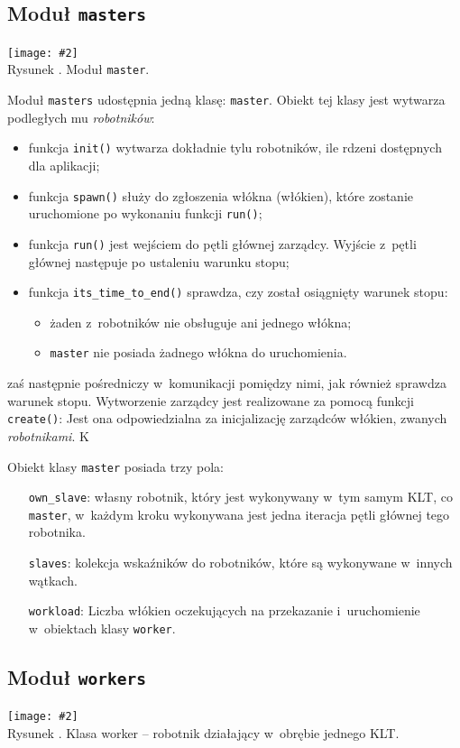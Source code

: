 \documentclass[12pt,makeidx]{mwart}
\newcommand{\code}{\texttt}
\newcounter{figmain}
\newcommand{\myownfigure}[4]{ \newcounter{#1} \setcounter{#1}{\value{figmain}} \addtocounter{figmain}{1} \begin{center} \label{fig:#1} \centering \texttt{[image: \#2]}\\ \nopagebreak[4] Rysunek \arabic{#1}. #3. \end{center}}
\begin{document}
\subsection{Moduł \code{masters}}
    \myownfigure{Master}{Master.png}{Moduł \code{master}}{.7}
%
\indent
  Moduł \code{masters} udostępnia jedną klasę: \code{master}.
  Obiekt tej klasy jest wytwarza podległych mu \emph{robotników}:  
  \begin{itemize}
    \item funkcja \code{init()} wytwarza dokładnie tylu robotników, ile rdzeni dostępnych dla aplikacji;
    \item funkcja \code{spawn()} służy do zgłoszenia włókna (włókien), które zostanie uruchomione po wykonaniu funkcji \code{run()};
    \item funkcja \code{run()} jest wejściem do pętli głównej zarządcy. Wyjście z~pętli głównej następuje po ustaleniu warunku stopu;
    \item funkcja \code{its\_time\_to\_end()} sprawdza, czy został osiągnięty warunek stopu:
      \begin{itemize}
        \item żaden z~robotników nie obsługuje ani jednego włókna;
        \item \code{master} nie posiada żadnego włókna do uruchomienia.
      \end{itemize}
  \end{itemize}
  zaś następnie pośredniczy w~komunikacji pomiędzy nimi, jak również sprawdza warunek stopu.
  Wytworzenie zarządcy jest realizowane za pomocą funkcji \code{create()}: 
  Jest ona odpowiedzialna za inicjalizację zarządców włókien, zwanych \emph{robotnikami}.
  K
\par
\indent
  Obiekt klasy \code{master} posiada trzy pola:
  \begin{itemize}
    \item[\code{own\_slave}:] własny robotnik, który jest wykonywany w~tym samym KLT, co \code{master}, w~każdym kroku wykonywana jest jedna iteracja pętli głównej 
    tego robotnika.
    \item[\code{slaves}:] kolekcja wskaźników do robotników, które są wykonywane w~innych wątkach.
    \item[\code{workload}:] Liczba włókien oczekujących na przekazanie i~uruchomienie w~obiektach klasy \code{worker}.
  \end{itemize}
\par
\subsection{Moduł \code{workers}}
    \myownfigure{Worker}{Worker.png}{Klasa worker -- robotnik działający w~obrębie jednego KLT}{.7}
%
\end{document}
